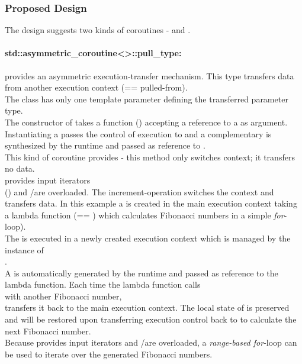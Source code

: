 
\subsubsection*{Proposed Design}
The design suggests two kinds of coroutines - \acoro and \scoro.

\paragraph*{std::asymmetric\_coroutine<>::pull\_type:}
provides an asymmetric execution-transfer mechanism. This type transfers data
from another execution context (== pulled-from).\\
The class has only one template parameter defining the transferred parameter
type.\\
The constructor of \pullcoro takes a function (\corofunction) accepting a
reference to a \pushcoro as argument.\\
Instantiating a \pullcoro passes the control of execution to \corofunction and a
complementary \pushcoro is synthesized by the runtime and passed as reference to
\corofunction.\\
\newline
This kind of coroutine provides \pullcoroop - this method only switches context;
it transfers no data.\\
\newline
\pullcoro provides input iterators\\
(\pullcoroiterator) and \bgin/\ed are overloaded. The increment-operation
switches the context and transfers data.
In this example a \pullcoro is created in the main execution context taking a
lambda function (== \corofunction) which calculates Fibonacci numbers in a
simple \textit{for}-loop).\\
The \corofunction is executed in a newly created execution context which is
managed by the instance of\\
\pullcoro.\\
A \pushcoro is automatically generated by the runtime and passed as reference
to the lambda function. Each time the lambda function calls\\
\pushcoroop with another Fibonacci number,\\
\pushcoro transfers it back to the main execution context. The local state of
\corofunction is preserved and will be restored upon transferring execution
control back to \corofunction to calculate the next Fibonacci number.\\
Because \pullcoro provides input iterators and \bgin/\ed are overloaded, a
\textit{range-based for}-loop can be used to iterate over the generated
Fibonacci numbers.

